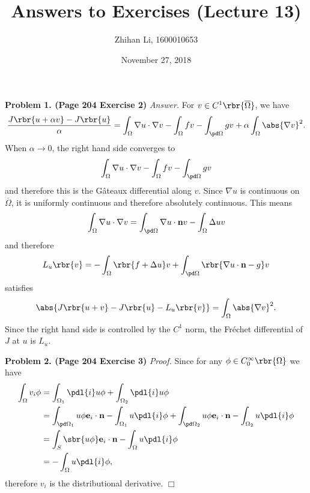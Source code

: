 \documentclass[english, nochinese]{pnote}
\title{Answers to Exercises (Lecture 13)}
\author{Zhihan Li, 1600010653}
\date{November 27, 2018}
\begin{document}
\maketitle

\textbf{Problem 1. (Page 204 Exercise 2)} \textit{Answer.} For $ v \in C^1 \rbr{\overline{\Omega}} $, we have
\begin{equation}
\frac{ J \rbr{ u + \alpha v } - J \rbr{u} }{\alpha }= \int_{\Omega} \nabla u \cdot \nabla v - \int_{\Omega} f v - \int_{ \pd \Omega } g v + \alpha \int_{\Omega} \abs{ \nabla v }^2.
\end{equation}
When $ \alpha \rightarrow 0 $, the right hand side converges to
\begin{equation}
\int_{\Omega} \nabla u \cdot \nabla v - \int_{\Omega} f v - \int_{ \pd \Omega } g v
\end{equation}
and therefore this is the G\^ateaux differential along $v$. Since $ \nabla u $ is continuous on $\overline{\Omega}$, it is uniformly continuous and therefore absolutely continuous. This means
\begin{equation}
\int_{\Omega} \nabla u \cdot \nabla v = \int_{ \pd \Omega } \nabla u \cdot \mathbf{n} v - \int_{\Omega} \Delta u v
\end{equation}
and therefore
\begin{equation}
L_u \rbr{v} = -\int_{\Omega} \rbr{ f + \Delta u } v + \int_{ \pd \Omega } \rbr{ \nabla u \cdot \mathbf{n} - g } v
\end{equation}
satisfies
\begin{equation}
\abs{ J \rbr{ u + v } - J \rbr{u} - L_u \rbr{v} } = \int_{\Omega} \abs{ \nabla v }^2.
\end{equation}
Since the right hand side is controlled by the $C^1$ norm, the Fr\'echet differential of $J$ at $u$ is $L_u$.

\textbf{Problem 2. (Page 204 Exercise 3)} \textit{Proof.} Since for any $ \phi \in C_0^{\infty} \rbr{\Omega} $ we have
\begin{equation}
\begin{split}
\int_{\Omega} v_i \phi &= \int_{\Omega_1} \pdl{i} u \phi + \int_{\Omega_2} \pdl{i} u \phi \\
&= \int_{ \pd \Omega_1 } u \phi \mathbf{e}_i \cdot \mathbf{n} - \int_{\Omega_1} u \pdl{i} \phi + \int_{ \pd \Omega_2 } u \phi \mathbf{e}_i \cdot \mathbf{n} - \int_{\Omega_2} u \pdl{i} \phi \\
&= \int_S \sbr{ u \phi } \mathbf{e}_i \cdot \mathbf{n} - \int_{\Omega} u \pdl{i} \phi \\
&= -\int_{\Omega} u \pdl{i} \phi,
\end{split}
\end{equation}
therefore $v_i$ is the distributional derivative.
\hfill$\Box$
\end{document}
